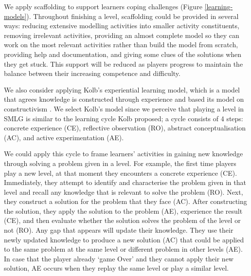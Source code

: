 \documentclass[12pt, a4paper]{report}
\begin{document}
We apply scaffolding \cite{vygotsky1978mind, wood1976role} to support learners coping challenges (Figure \ref{learning-models}). Throughout finishing a level, scaffolding could be provided in several ways: reducing extensive modelling activities into smaller activity constituents, removing irrelevant activities, providing an almost complete model so they can work on the most relevant activities rather than build the model from scratch, providing help and documentation, and giving some clues of the solutions when they get stuck. This support will be reduced as players progress to maintain the balance between their increasing competence and difficulty.

We also consider applying Kolb's experiential learning model, which is a model that agrees knowledge is constructed through experience and based its model on constructivism \cite{kolb2014experiential}. We select Kolb's model since we perceive that playing a level in SMLG is similar to the learning cycle Kolb proposed; a cycle consists of 4 steps: concrete experience (CE), reflective observation (RO), abstract conceptualisation (AC), and active experimentation (AE). 

We could apply this cycle to frame learners' activities in gaining new knowledge through solving a problem given in a level. For example, the first time players play a new level, at that moment they encounters a concrete experience (CE). Immediately, they attempt to identify and characterise the problem given in that level and recall any knowledge that is relevant to solve the problem (RO). Next, they construct a solution for the problem that they face (AC). After constructing the solution, they apply the solution to the problem (AE), experience the result (CE), and then evaluate whether the solution solves the problem of the level or not (RO). Any gap that appears will update their knowledge. They use their newly updated knowledge to produce a new solution (AC) that could be applied to the same problem at the same level or different problem in other levels (AE). In case that the player already `game Over' and they cannot apply their new solution, AE occurs when they replay the same level or play a similar level.
\end{document}
